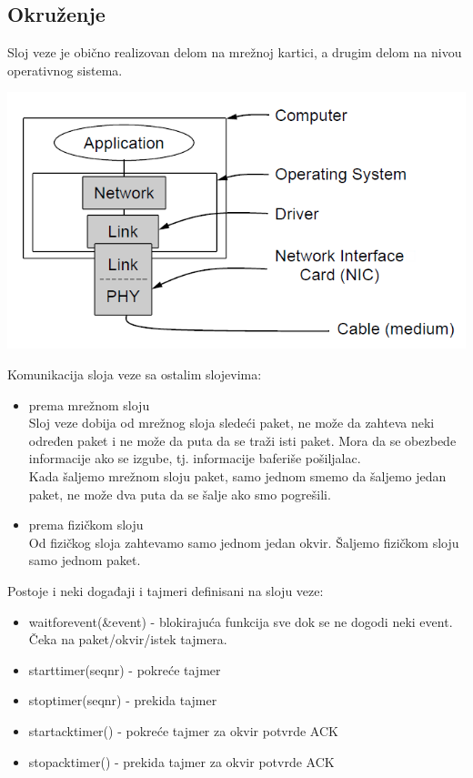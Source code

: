 \documentclass{article} %
\begin{document}
\subsection{Okruženje}
Sloj veze je obično realizovan delom na mrežnoj kartici, a drugim delom na nivou operativnog sistema. 
\begin{center}
	\includegraphics[scale=0.3]{okruzenjeSV}
\end{center}
Komunikacija sloja veze sa ostalim slojevima:
\begin{itemize}
  \item prema mrežnom sloju\\
  Sloj veze dobija od mrežnog sloja sledeći paket, ne može da zahteva neki određen paket i ne može da puta da se traži isti paket. Mora da se obezbede informacije ako se izgube, tj. informacije baferiše pošiljalac.\\
  Kada šaljemo mrežnom sloju paket, samo jednom smemo da šaljemo jedan paket, ne može dva puta da se šalje ako smo pogrešili.
  \item prema fizičkom sloju\\
  Od fizičkog sloja zahtevamo samo jednom jedan okvir. Šaljemo fizičkom sloju samo jednom paket. 
\end{itemize}

Postoje i neki događaji i tajmeri definisani na sloju veze:
\begin{itemize}
  \item wait\textunderscore for\textunderscore event(\&event) - blokirajuća funkcija sve dok se ne dogodi neki event. Čeka na paket/okvir/istek tajmera.
  \item start\textunderscore timer(seq\textunderscore nr) - pokreće tajmer
  \item stop\textunderscore timer(seq\textunderscore nr) - prekida tajmer
  \item start\textunderscore ack\textunderscore timer() - pokreće tajmer za okvir potvrde ACK
  \item stop\textunderscore ack\textunderscore timer() - prekida tajmer za okvir potvrde ACK
\end{itemize}
\end{document}
